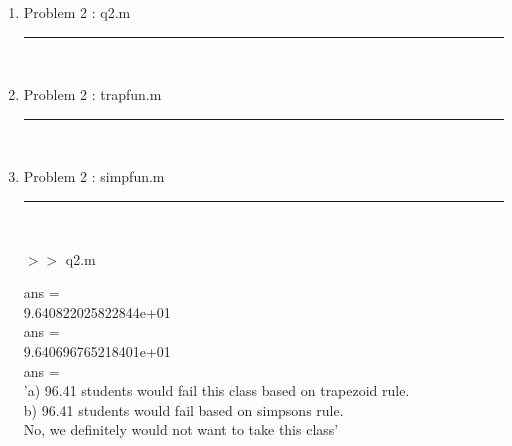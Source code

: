 \documentclass[12pt]{article}
\begin{document}
	\begin{enumerate}
	
	\item[] Problem 2 : q2.m \noindent\rule{\textwidth}{1.0pt} \\
	
	
	\item[] Problem 2 : trapfun.m \noindent\rule{\textwidth}{1.0pt} \\
		
	
	\item[] Problem 2 : simpfun.m \noindent\rule{\textwidth}{1.0pt} \\
		
	
	\pagebreak	
	
	$>>$ q2.m
	\begin{framed}
		ans =\\
     9.640822025822844e+01\\


ans =\\
     9.640696765218401e+01\\


ans =\\
    'a) 96.41 students would fail this class based on trapezoid rule.\\
     b) 96.41 students would fail based on simpsons rule.\\
     No, we definitely would not want to take this class'
	\end{framed}
	
	\end{enumerate}
	\pagebreak
\end{document}
